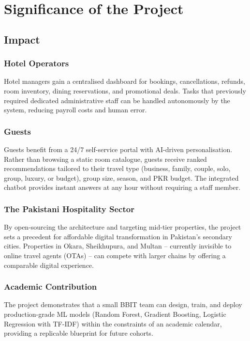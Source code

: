 \documentclass[12pt,a4paper]{report}
\begin{document}
\chapter{Significance of the Project}

\section{Impact}

\subsection*{Hotel Operators}
Hotel managers gain a centralised dashboard for bookings, cancellations, refunds, room inventory, dining reservations, and promotional deals. Tasks that previously required dedicated administrative staff can be handled autonomously by the system, reducing payroll costs and human error.

\subsection*{Guests}
Guests benefit from a 24/7 self-service portal with AI-driven personalisation. Rather than browsing a static room catalogue, guests receive ranked recommendations tailored to their travel type (business, family, couple, solo, group, luxury, or budget), group size, season, and PKR budget. The integrated chatbot provides instant answers at any hour without requiring a staff member.

\subsection*{The Pakistani Hospitality Sector}
By open-sourcing the architecture and targeting mid-tier properties, the project sets a precedent for affordable digital transformation in Pakistan's secondary cities. Properties in Okara, Sheikhupura, and Multan -- currently invisible to online travel agents (OTAs) -- can compete with larger chains by offering a comparable digital experience.

\subsection*{Academic Contribution}
The project demonstrates that a small BBIT team can design, train, and deploy production-grade ML models (Random Forest, Gradient Boosting, Logistic Regression with TF-IDF) within the constraints of an academic calendar, providing a replicable blueprint for future cohorts.
\end{document}
